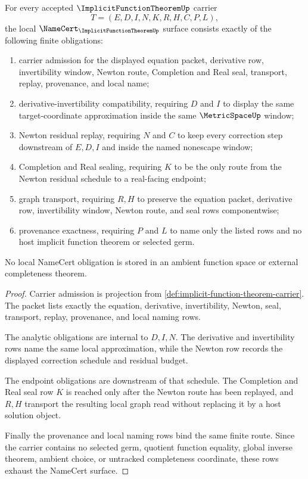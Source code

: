 \begin{theorem}
\label{thm:implicit-function-theorem-namecert-obligations}
For every accepted $\ImplicitFunctionTheoremUp$ carrier
$$
T=(E,D,I,N,K,R,H,C,P,L),
$$
the local $\NameCert_{\ImplicitFunctionTheoremUp}$ surface consists exactly of the following finite obligations:
\begin{enumerate}
\item carrier admission for the displayed equation packet, derivative row, invertibility window, Newton route, Completion and Real seal, transport, replay, provenance, and local name;
\item derivative-invertibility compatibility, requiring $D$ and $I$ to display the same target-coordinate approximation inside the same $\MetricSpaceUp$ window;
\item Newton residual replay, requiring $N$ and $C$ to keep every correction step downstream of $E,D,I$ and inside the named nonescape window;
\item Completion and Real sealing, requiring $K$ to be the only route from the Newton residual schedule to a real-facing endpoint;
\item graph transport, requiring $R,H$ to preserve the equation packet, derivative row, invertibility window, Newton route, and seal rows componentwise;
\item provenance exactness, requiring $P$ and $L$ to name only the listed rows and no host implicit function theorem or selected germ.
\end{enumerate}
No local NameCert obligation is stored in an ambient function space or external completeness theorem.
\end{theorem}
\begin{proof}
Carrier admission is projection from \autoref{def:implicit-function-theorem-carrier}. The packet lists exactly the equation, derivative, invertibility, Newton, seal, transport, replay, provenance, and local naming rows.

The analytic obligations are internal to $D,I,N$. The derivative and invertibility rows name the same local approximation, while the Newton row records the displayed correction schedule and residual budget.

The endpoint obligations are downstream of that schedule. The Completion and Real seal row $K$ is reached only after the Newton route has been replayed, and $R,H$ transport the resulting local graph read without replacing it by a host solution object.

Finally the provenance and local naming rows bind the same finite route. Since the carrier contains no selected germ, quotient function equality, global inverse theorem, ambient choice, or untracked completeness coordinate, these rows exhaust the NameCert surface.
\end{proof}

